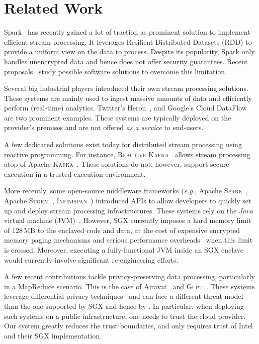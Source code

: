 \section{Related Work}\label{sec:rw}

Spark~\cite{Zaharia:2013:DSF:2517349.2522737} has recently gained a lot of traction as prominent solution to implement efficient stream processing.
It leverages Resilient Distributed Datasets (RDD) to provide a uniform view on the data to process.
Despite its popularity, Spark only handles unencrypted data and hence does not offer security guarantees.
Recent proposals~\cite{7840754} study possible software solutions to overcome this limitation.

Several big industrial players introduced their own stream processing solutions.
These systems are mainly used to ingest massive amounts of data and efficiently perform (real-time) analytics.
Twitter's Heron~\cite{Kulkarni:2015:THS:2723372.2742788}, and Google's Cloud DataFlow~\cite{Akidau:2015:DMP:2824032.2824076} are two prominent examples.
These systems are typically deployed on the provider's premises and are not offered \emph{as a service} to end-users.

A few dedicated solutions exist today for distributed stream processing using reactive programming.
For instance, \textsc{Reactive Kafka}~\cite{reactivekafka} allows stream processing atop of Apache \textsc{Kafka}~\cite{apachekafka,kreps2011kafka}.
These solutions do not, however, support secure execution in a trusted execution environment.

More recently, some open-source middleware frameworks (\emph{e.g.}, Apache \textsc{Spark}~\cite{apachesparkstreaming}, Apache \textsc{Storm}~\cite{apachestorm}, \textsc{Infinispan}~\cite{infinispan}) introduced APIs to allow developers to quickly set up and deploy stream processing infrastructures.
These systems rely on the \emph{Java} virtual machine (JVM)~\cite{lindholm2014java}.
However, SGX currently imposes a hard memory limit of 128\,MB to the enclaved code and data, at the cost of expensive encrypted memory paging mechanisms and serious performance overheads~\cite{pires_scbr:2016,brenner_securekeeper:_2016} when this limit is crossed.
Moreover, executing a fully-functional JVM inside an SGX enclave would currently involve significant re-engineering efforts.

A few recent contributions tackle privacy-preserving data processing, particularly in a MapReduce scenario.
This is the case of Airavat~\cite{Roy:2010:ASP:1855711.1855731} and \textsc{Gupt}~\cite{Mohan:2012:GPP:2213836.2213876}.
These systems leverage differential-privacy techniques~\cite{dwork2006calibrating} and can face a different threat model than the one supported by SGX and hence by \SYS.
In particular, when deploying such systems on a public infrastructure, one needs to trust the cloud provider.
Our system greatly reduces the trust boundaries, and only requires trust of Intel{\textregistered} and their SGX implementation.


